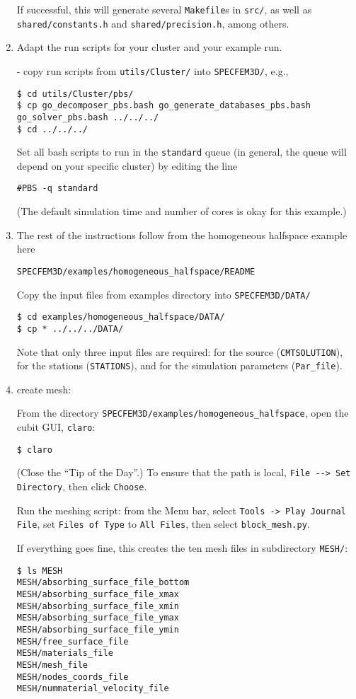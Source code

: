 \documentclass[10pt,fleqn,letterpaper]{article}
\begin{document}
\begin{enumerate}
If successful, this will generate several \verb+Makefile+s in \verb+src/+, as well as \verb+shared/constants.h+ and \verb+shared/precision.h+, among others.

\item Adapt the run scripts for your cluster and your example run.

- copy run scripts from \verb+utils/Cluster/+ into \verb+SPECFEM3D/+, e.g.,
\begin{lstlisting}
$ cd utils/Cluster/pbs/
$ cp go_decomposer_pbs.bash go_generate_databases_pbs.bash go_solver_pbs.bash ../../../
$ cd ../../../
\end{lstlisting}

Set all bash scripts to run in the \verb+standard+ queue (in general, the queue will depend on your specific cluster) by editing the line
\begin{lstlisting}
#PBS -q standard
\end{lstlisting}
(The default simulation time and number of cores is okay for this example.)
 
\item The rest of the instructions follow from the homogeneous halfspace example here
\begin{lstlisting}
SPECFEM3D/examples/homogeneous_halfspace/README
\end{lstlisting}

Copy the input files from examples directory into \verb+SPECFEM3D/DATA/+
\begin{lstlisting}
$ cd examples/homogeneous_halfspace/DATA/
$ cp * ../../../DATA/
\end{lstlisting}
%
Note that only three input files are required: for the source (\verb+CMTSOLUTION+), for the stations (\verb+STATIONS+), and for the simulation parameters (\verb+Par_file+).

\item create mesh:

From the directory \verb+SPECFEM3D/examples/homogeneous_halfspace+, open the cubit GUI, \verb+claro+:
\begin{lstlisting}
$ claro
\end{lstlisting}
%
(Close the ``Tip of the Day''.)
To ensure that the path is local, \verb+File --> Set Directory+, then click \verb+Choose+.

Run the meshing script: from the Menu bar, select \verb+Tools -> Play Journal File+, set \verb+Files of Type+ to \verb+All Files+, then select \verb+block_mesh.py+.

If everything goes fine, this creates the ten mesh files in subdirectory \verb+MESH/+:
\begin{lstlisting}
$ ls MESH
MESH/absorbing_surface_file_bottom
MESH/absorbing_surface_file_xmax
MESH/absorbing_surface_file_xmin
MESH/absorbing_surface_file_ymax
MESH/absorbing_surface_file_ymin
MESH/free_surface_file
MESH/materials_file
MESH/mesh_file
MESH/nodes_coords_file
MESH/nummaterial_velocity_file
\end{lstlisting}


\end{enumerate}
\end{document}
